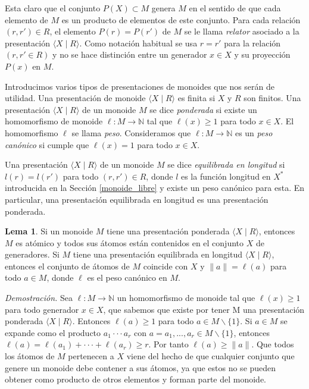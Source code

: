 \documentclass[12pt]{article}
\theoremstyle{definition}
\newtheorem{lema}{Lema}[section]
\providecommand{\norm}[1]{\lVert#1\rVert}
\begin{document}
Esta claro que el conjunto $P(X)\subset M$ genera $M$ en el sentido de que cada elemento de $M$ es un producto de elementos de este conjunto. Para cada relación $(r,r')\in R$, el elemento $P(r)=P(r')$ de $M$ se le llama \textit{relator} asociado a la presentación $\langle X\mid R\rangle$. Como notación habitual se usa $r=r'$ para la relación $(r,r'\in R)$ y no se hace distinción entre un generador $x\in X$ y su proyección $P(x)$ en $M$. 




Introducimos varios tipos de presentaciones de monoides que nos serán de utilidad. Una presentación de monoide $\langle X\mid R\rangle$ es finita si $X$ y $R$ son finitos. Una presentación $\langle X\mid R\rangle$ de un monoide $M$ se dice \textit{ponderada} si existe un homomorfismo de monoide $\ell:M\rightarrow \mathbb{N}$ tal que $\ell(x)\geq 1$ para todo $x\in X$. El homomorfismo $\ell$ se llama \textit{peso}. Consideramos que $\ell:M\rightarrow \mathbb{N}$ es un \textit{peso canónico} si cumple que $\ell(x)=1$ para todo $x\in X$.

Una presentación $\langle X\mid R\rangle$ de un monoide $M$ se dice \textit{equilibrada en longitud} si $l(r)=l(r')$ para todo $(r,r')\in R$, donde $l$ es la función longitud en $X^*$ introducida en la Sección \ref{monoide_libre} y existe un peso canónico para esta. En particular, una presentación equilibrada en longitud es una presentación ponderada.

\begin{lema}
Si un monoide $M$ tiene una presentación ponderada $\langle X\mid R\rangle$, entonces $M$ es atómico y todos sus átomos están contenidos en el conjunto $X$ de generadores. Si $M$ tiene una presentación equilibrada en longitud $\langle X\mid R\rangle$, entonces el conjunto de átomos de $M$ coincide con $X$ y $\norm{a}=\ell(a)$ para todo $a\in M$, donde $\ell$ es el peso canónico en $M$.
\label{lema:presen_mono}
\end{lema}

\textit{Demostración.} Sea $\ell: M\rightarrow \mathbb{N}$ un homomorfismo de monoide tal que $\ell(x)\geq 1$ para todo generador $x\in X$, que sabemos que existe por tener M  una presentación ponderada $\langle X\mid R\rangle$. Entonces $\ell(a)\geq 1$ para todo $a\in M \backslash\{1\}$. Si $a\in M$ se expande como el producto $a_1\cdot\cdot\cdot a_r$ con $a = a_1,...,a_r\in M\backslash\{1\}$, entonces $\ell(a)=\ell(a_1)+\cdot\cdot\cdot+\ell(a_r)\geq r$. Por tanto $\ell(a)\geq \norm{a}$. Que todos los átomos de $M$ pertenecen a $X$ viene del hecho de que cualquier conjunto que genere un monoide debe contener a sus átomos, ya que estos no se pueden obtener como producto de otros elementos y forman parte del monoide. 
\end{document}
